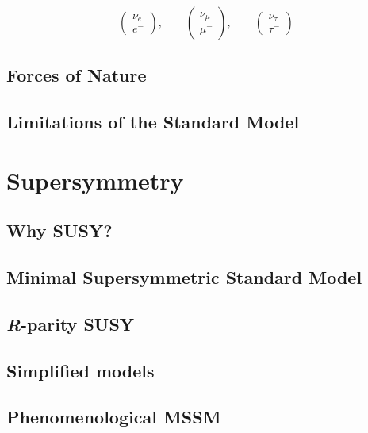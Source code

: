 				
				\begin{equation*}
				\label{eqn:lepton_flavor_doublets}
					\begin{pmatrix} \nu_e      \\ e^-    \end{pmatrix}, \qquad
					\begin{pmatrix} \nu_{\mu}  \\ \mu^-  \end{pmatrix}, \qquad
					\begin{pmatrix} \nu_{\tau} \\ \tau^- \end{pmatrix}
				\end{equation*}






			\subsection*{Forces of Nature}	



		\subsection{Limitations of the Standard Model}
		\label{sec:SMlim}





	\section{Supersymmetry}
	\label{sec:SUSY}

		\subsection{Why SUSY?}

		\subsection{Minimal Supersymmetric Standard Model}

		\subsection{\emph{R}-parity SUSY}
		
		\subsection{Simplified models}

		\subsection{Phenomenological MSSM}
